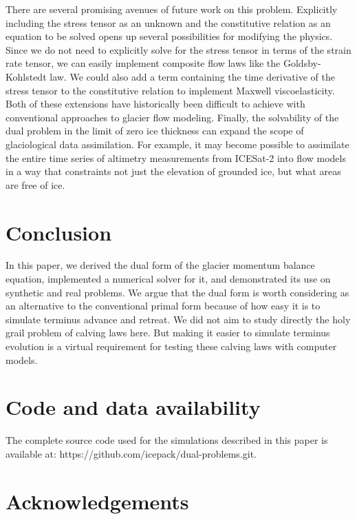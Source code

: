 \documentclass[twocolumn,letterpaper]{igs}
\begin{document}
There are several promising avenues of future work on this problem.
Explicitly including the stress tensor as an unknown and the constitutive relation as an equation to be solved opens up several possibilities for modifying the physics.
Since we do not need to explicitly solve for the stress tensor in terms of the strain rate tensor, we can easily implement composite flow laws like the Goldsby-Kohlstedt law.
We could also add a term containing the time derivative of the stress tensor to the constitutive relation to implement Maxwell viscoelasticity.
Both of these extensions have historically been difficult to achieve with conventional approaches to glacier flow modeling.
Finally, the solvability of the dual problem in the limit of zero ice thickness can expand the scope of glaciological data assimilation.
For example, it may become possible to assimilate the entire time series of altimetry measurements from ICESat-2 into flow models in a way that constraints not just the elevation of grounded ice, but what areas are free of ice.


\section{Conclusion}

In this paper, we derived the dual form of the glacier momentum balance equation, implemented a numerical solver for it, and demonstrated its use on synthetic and real problems.
We argue that the dual form is worth considering as an alternative to the conventional primal form because of how easy it is to simulate terminus advance and retreat.
We did not aim to study directly the holy grail problem of calving laws here.
But making it easier to simulate terminus evolution is a virtual requirement for testing these calving laws with computer models.



\section{Code and data availability}

The complete source code used for the simulations described in this paper is available at: https://github.com/icepack/dual-problems.git.



\section{Acknowledgements}
\end{document}
